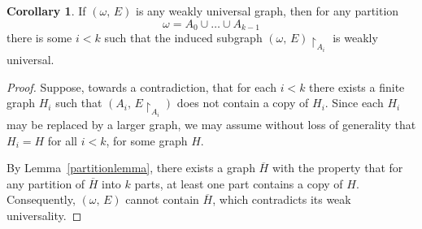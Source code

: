 \documentclass{amsart}
\theoremstyle{plain}
\theoremstyle{definition}
\newtheorem{cor}[theorem]{Corollary}
\theoremstyle{remark}
\numberwithin{equation}{section}
\begin{document}
\begin{cor}\label{partitionregular}
    If $(\omega,\,E)$ is any weakly universal graph, then for any partition
    $$\omega=A_0\cup \ldots \cup A_{k-1}$$
    there is some $i<k$ such that the induced subgraph $(\omega, \, E)\restriction_{A_i}$ is weakly universal.
\end{cor}

\begin{proof}
Suppose, towards a contradiction, that for each \(i<k\) there exists a finite graph \(H_{i}\) such that  
\((A_{i},\, E\restriction_{A_{i}})\) does not contain a copy of \(H_{i}\).  
Since each \(H_{i}\) may be replaced by a larger graph, we may assume without loss of generality that  
\(H_{i}=H\) for all \(i<k\), for some graph \(H\).  

By Lemma~\ref{partitionlemma}, there exists a graph \(\overline{H}\) with the property that for any partition of \(\overline{H}\) into \(k\) parts, at least one part contains a copy of \(H\).  
Consequently, \((\omega,\,E)\) cannot contain \(\overline{H}\), which contradicts its weak universality.
\end{proof}
\end{document}

